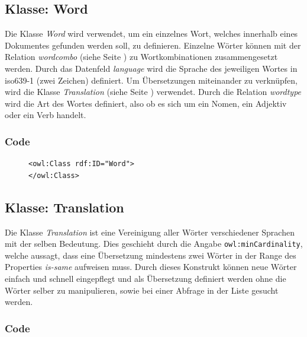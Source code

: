 \documentclass[
    11pt,
    latin1,
    a4paper,
    oneside
]{scrreprt}
\begin{document}
\subsection{Klasse: Word} \label{sec:class_word}

Die Klasse \emph{Word} wird verwendet, um ein einzelnes Wort, welches innerhalb eines Dokumentes gefunden werden soll, zu definieren. Einzelne W\"orter k\"onnen mit der Relation \emph{wordcombo} (siehe  Seite \pageref{sec:rel_wordcombo}) zu Wortkombinationen zusammengesetzt werden. Durch das Datenfeld \emph{language} wird die Sprache des jeweiligen Wortes in iso639-1 (zwei Zeichen) definiert. Um \"Ubersetzungen miteinander zu verkn\"upfen, wird die Klasse \emph{Translation} (siehe  Seite \pageref{sec:class_translation}) verwendet. Durch die Relation \emph{wordtype} wird die Art des Wortes definiert, also ob es sich um ein Nomen, ein Adjektiv oder ein Verb handelt.

\subsubsection{Code}  \label{sec:class_word_code}

\begin{figure}[H]
 \lstset{language=XML}
 \begin{lstlisting}[label=owl:word,caption={Die Klasse \emph{Word} beschreibt ein einzelnes Wort}]
<owl:Class rdf:ID="Word">
</owl:Class>
 \end{lstlisting}
\end{figure}

\subsection{Klasse: Translation} \label{sec:class_translation}

Die Klasse \emph{Translation} ist eine Vereinigung aller W\"orter verschiedener Sprachen mit der selben Bedeutung. Dies geschieht durch die Angabe \texttt{owl:minCardinality}, welche aussagt, dass eine \"Ubersetzung mindestens zwei W\"orter in der Range des Properties \emph{is-same} aufweisen muss. Durch dieses Konstrukt k\"onnen neue W\"orter einfach und schnell eingepflegt und als \"Ubersetzung definiert werden ohne die W\"orter selber zu manipulieren, sowie bei einer Abfrage in der Liste gesucht werden.

\subsubsection{Code}  \label{sec:class_translation_code}
\end{document}
